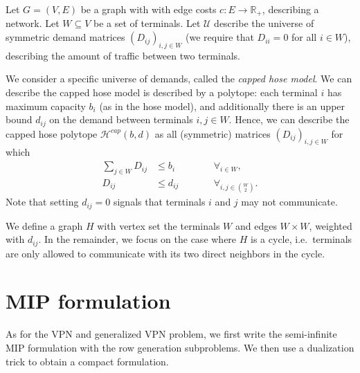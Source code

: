 \documentclass[11pt]{article}
\begin{document}
    Let $G = (V, E)$ be a graph with with edge costs $c\colon E \to \mathbb R_+$, describing a network.
    Let $W \subseteq V$ be a set of terminals.
    Let $\mathcal U$ describe the universe of symmetric demand matrices $(D_{ij})_{i,j \in W}$ (we require that $D_{ii} = 0$ for all $i \in W$), describing the amount of traffic between two terminals.

    We consider a specific universe of demands, called the \emph{capped hose model}.
    We can describe the capped hose model is described by a polytope: each terminal $i$ has maximum capacity $b_i$ (as in the hose model), and additionally there is an upper bound $d_{ij}$ on the demand between terminals $i,j \in W$.
    Hence, we can describe the capped hose polytope $\mathcal H^{cap}(b, d)$ as all (symmetric) matrices $(D_{ij})_{i,j \in W}$ for which
    \[
        \begin{split}
            \sum_{j \in W} D_{ij} &\le b_i \qquad&&\forall_{i \in W}, \\
            D_{ij} &\le d_{ij} \qquad&&\forall_{i,j \in \binom W 2}.
        \end{split}
    \]
    Note that setting $d_{ij} = 0$ signals that terminals $i$ and $j$ may not communicate.

    We define a graph $H$ with vertex set the terminals $W$ and edges $W \times W$, weighted with $d_{ij}$.
    In the remainder, we focus on the case where $H$ is a cycle, i.e.\ terminals are only allowed to communicate with its two direct neighbors in the cycle.

    \section{MIP formulation}
    As for the VPN and generalized VPN problem, we first write the semi-infinite MIP formulation with the row generation subproblems.
    We then use a dualization trick to obtain a compact formulation.
\end{document}
